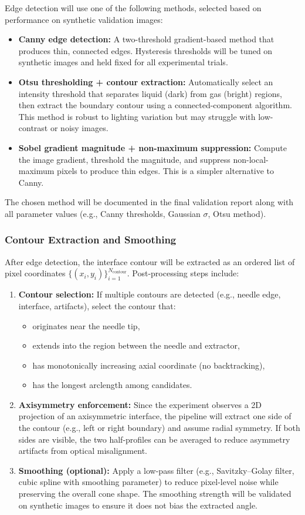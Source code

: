 Edge detection will use one of the following methods, selected based on performance on synthetic validation images:
\begin{itemize}
    \item \textbf{Canny edge detection:} A two-threshold gradient-based method that produces thin, connected edges. Hysteresis thresholds will be tuned on synthetic images and held fixed for all experimental trials.
    \item \textbf{Otsu thresholding + contour extraction:} Automatically select an intensity threshold that separates liquid (dark) from gas (bright) regions, then extract the boundary contour using a connected-component algorithm. This method is robust to lighting variation but may struggle with low-contrast or noisy images.
    \item \textbf{Sobel gradient magnitude + non-maximum suppression:} Compute the image gradient, threshold the magnitude, and suppress non-local-maximum pixels to produce thin edges. This is a simpler alternative to Canny.
\end{itemize}

The chosen method will be documented in the final validation report along with all parameter values (e.g., Canny thresholds, Gaussian $\sigma$, Otsu method).

\subsubsection{Contour Extraction and Smoothing}

After edge detection, the interface contour will be extracted as an ordered list of pixel coordinates $\{(x_i, y_i)\}_{i=1}^{N_{\text{contour}}}$. Post-processing steps include:
\begin{enumerate}
    \item \textbf{Contour selection:} If multiple contours are detected (e.g., needle edge, interface, artifacts), select the contour that:
    \begin{itemize}
        \item originates near the needle tip,
        \item extends into the region between the needle and extractor,
        \item has monotonically increasing axial coordinate (no backtracking),
        \item has the longest arclength among candidates.
    \end{itemize}
    \item \textbf{Axisymmetry enforcement:} Since the experiment observes a 2D projection of an axisymmetric interface, the pipeline will extract one side of the contour (e.g., left or right boundary) and assume radial symmetry. If both sides are visible, the two half-profiles can be averaged to reduce asymmetry artifacts from optical misalignment.
    \item \textbf{Smoothing (optional):} Apply a low-pass filter (e.g., Savitzky--Golay filter, cubic spline with smoothing parameter) to reduce pixel-level noise while preserving the overall cone shape. The smoothing strength will be validated on synthetic images to ensure it does not bias the extracted angle.
\end{enumerate}


